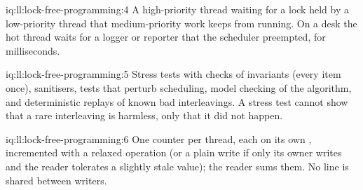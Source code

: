 \begin{solution}{iq:ll:lock-free-programming:4}
A high-priority thread waiting for a lock held by a low-priority thread that medium-priority work keeps from running. On a desk the
hot thread waits for a logger or reporter that the scheduler preempted, for milliseconds.
\end{solution}

\begin{solution}{iq:ll:lock-free-programming:5}
Stress tests with checks of invariants (every item once), sanitisers, tests that perturb scheduling, model checking of the
algorithm, and deterministic replays of known bad interleavings. A stress test cannot show that a rare interleaving is
harmless, only that it did not happen.
\end{solution}

\begin{solution}{iq:ll:lock-free-programming:6}
One counter per thread, each on its own , incremented with a relaxed operation (or a plain write if only its owner
writes and the reader tolerates a slightly stale value); the reader sums them. No line is shared between writers.
\end{solution}
